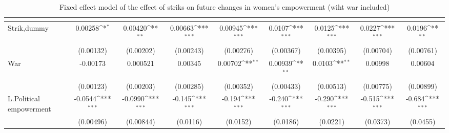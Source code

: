 \begin{table}[htbp]\centering
\def\sym#1{\ifmmode^{#1}\else\(^{#1}\)\fi}
\caption{Fixed effect model of the effect of striks on future changes in women's empowerment (wiht war included) \label{fepolemstrikswar}}
\begin{tabular}{l*{8}{c}}
\hline\hline
                    &&&&&&&&\\
\hline
Strik,dummy         &     0.00258\sym{*}  &     0.00420\sym{**} &     0.00663\sym{***}&     0.00945\sym{***}&      0.0107\sym{***}&      0.0125\sym{***}&      0.0227\sym{***}&      0.0196\sym{**} \\
                    &   (0.00132)         &   (0.00202)         &   (0.00243)         &   (0.00276)         &   (0.00367)         &   (0.00395)         &   (0.00704)         &   (0.00761)         \\
[1em]
War                 &    -0.00173         &    0.000521         &     0.00345         &     0.00702\sym{**} &     0.00939\sym{**} &      0.0103\sym{**} &     0.00998         &     0.00604         \\
                    &   (0.00123)         &   (0.00203)         &   (0.00285)         &   (0.00352)         &   (0.00433)         &   (0.00513)         &   (0.00775)         &   (0.00899)         \\
[1em]
L.Political empowerment&     -0.0544\sym{***}&     -0.0990\sym{***}&      -0.145\sym{***}&      -0.194\sym{***}&      -0.240\sym{***}&      -0.290\sym{***}&      -0.515\sym{***}&      -0.684\sym{***}\\
                    &   (0.00496)         &   (0.00844)         &    (0.0116)         &    (0.0152)         &    (0.0186)         &    (0.0221)         &    (0.0373)         &    (0.0455)         \\
[1em]

\end{tabular}
\end{table}
